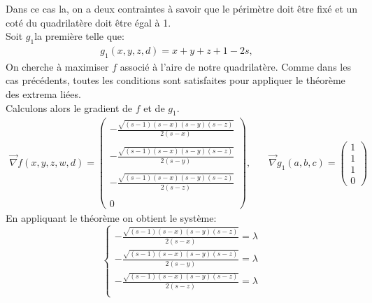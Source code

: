 \documentclass[12pt]{report}
\begin{document}
Dans ce cas la, on a deux contraintes à savoir que le périmètre doit être fixé et un coté du quadrilatère doit être égal à 1.\\
\indent Soit $g_{1}$la première telle que:
\begin{align*}
     g_{1}(x,y,z,d)=x+y+z+1-2s,\quad 
\end{align*}
On cherche à maximiser $f$ associé à l'aire de notre quadrilatère.
Comme dans les cas précédents, toutes les conditions sont satisfaites pour appliquer le théorème des extrema liées.\\
Calculons alors le gradient de $f$ et de $g_{1}$.
\begin{align*}
\overrightarrow{\nabla}f(x,y,z,w,d) = 
\left(\begin{matrix}
-\frac{\sqrt{\left(s - 1\right) \left(s - x\right) \left(s - y\right) \left(s - z\right)} }{2 \left(s - x\right)}\\ \\
- \frac{\sqrt{\left(s - 1\right) \left(s - x\right) \left(s - y\right) \left(s - z\right)}}{2 \left(s - y\right)}\\ \\
- \frac{\sqrt{\left(s - 1\right) \left(s - x\right) \left(s - y\right) \left(s - z\right)}}{2 \left(s - z\right)}\\ \\
0
\end{matrix}\right),\quad          &  \overrightarrow{\nabla}g_{1}(a,b,c) = 
\left(\begin{matrix}
1 \\ 
1 \\ 
1 \\ 
0
\end{matrix}\right)      
\end{align*}
En appliquant le théorème on obtient le système:
\begin{equation}
\begin{cases} -\frac{\sqrt{\left(s - 1\right) \left(s - x\right) \left(s - y\right) \left(s - z\right)} }{2 \left(s - x\right)} = \lambda \\
-\frac{\sqrt{\left(s - 1\right) \left(s - x\right) \left(s - y\right) \left(s - z\right)} }{2 \left(s - y\right)}= \lambda  \\
-\frac{\sqrt{\left(s - 1\right) \left(s - x\right) \left(s - y\right) \left(s - z\right)} }{2 \left(s - z\right)} = \lambda \\

 \end{cases}
\end{equation}
\end{document}
